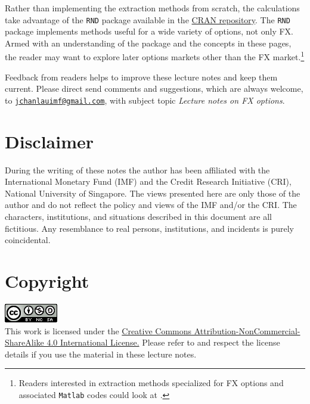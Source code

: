 \documentclass[]{book}
\let\rmarkdownfootnote\footnote%
\def\footnote{\protect\rmarkdownfootnote}
\theoremstyle{definition}
\theoremstyle{definition}
\theoremstyle{definition}
\theoremstyle{remark}
\begin{document}
Rather than implementing the extraction methods from scratch, the
calculations take advantage of the \texttt{RND} package \citep{R-RND}
available in the \href{https://cran.r-project.org/}{CRAN repository}.
The \texttt{RND} package implements methods useful for a wide variety of
options, not only FX. Armed with an understanding of the package and the
concepts in these pages, the reader may want to explore later options
markets other than the FX market.\footnote{Readers interested in
  extraction methods specialized for FX options and associated
  \texttt{Matlab} codes could look at \citet{Blake-Rule2015}.}

Feedback from readers helps to improve these lecture notes and keep them
current. Please direct send comments and suggestions, which are always
welcome, to
\href{mailto:jchanlauimf@gmail.com}{\nolinkurl{jchanlauimf@gmail.com}},
with subject topic \emph{Lecture notes on FX options}.

\section*{Disclaimer}\label{disclaimer}

 During the writing of these notes the author has been affiliated with
the International Monetary Fund (IMF) and the Credit Research Initiative
(CRI), National University of Singapore. The views presented here are
only those of the author and do not reflect the policy and views of the
IMF and/or the CRI. The characters, institutions, and situations
described in this document are all fictitious. Any resemblance to real
persons, institutions, and incidents is purely coincidental.

\section*{Copyright}\label{copyright}

\includegraphics{images/by-nc-sa.png}\\
This work is licensed under the
\href{http://creativecommons.org/licenses/by-nc-sa/4.0/}{Creative
Commons Attribution-NonCommercial-ShareAlike 4.0 International License.}
Please refer to and respect the license details if you use the material
in these lecture notes.
\end{document}
